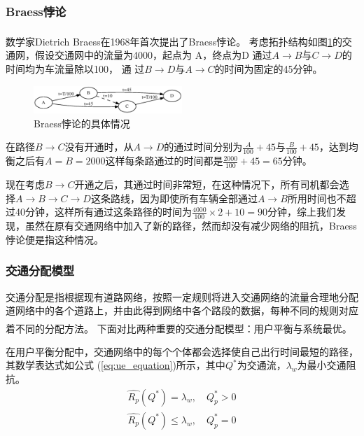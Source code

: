 \documentclass[fontset=fandol,a4paper,12pt]{ctexart}
\newcommand{\upcite}[1]{\textsuperscript{\textsuperscript{\cite{#1}}}}
\renewcommand{\eqref}[1]{公式 (\ref{#1})}
\begin{document}
		\subsubsection{Braess悖论}
			数学家Dietrich Braess在1968年首次提出了Braess悖论\upcite{Braess1968Ü}。
			考虑拓扑结构如图\ref{fig:braess}的交通网，假设交通网中的流量为4000，起点为	A，终点为D
			通过$ A \rightarrow B $与$ C \rightarrow D $的时间均为车流量除以100，	通
			过$ B \rightarrow D $与$ A \rightarrow C $的时间为固定的45分钟。
			\begin{figure}[!htbp]
				\centering
				\includegraphics[width=0.5\textwidth]{pic/braess.eps}
				\caption{Braess悖论的具体情况}
				\label{fig:braess}
			\end{figure}
			在路径$ B \rightarrow C $没有开通时，从$ A \rightarrow D $的通过时间分别为$ \frac{A}{100}+45 $与$ \frac{B}
			{100} + 45 $，达到均衡之后有$ A=B=2000 $这样每条路通过的时间都是$ \frac{2000}{100}
			+45=65 $分钟。
		
			现在考虑$ B \rightarrow C $开通之后，其通过时间非常短，在这种情况下，所有司机都会选择$ A \rightarrow B \rightarrow C \rightarrow D $这条路线，因为即使所有车辆全部通过$ A \rightarrow B $所用时间也不超过40分钟，这样所有通过这条路径的时间为$ \frac{4000}{100}\times 2+10=90$分钟，综上我们发现，虽然在原有交通网络中加入了新的路径，然而却没有减少网络的阻抗，Braess悖论便是指这种情况。		
		\subsubsection{交通分配模型}
			交通分配是指根据现有道路网络，按照一定规则将进入交通网络的流量合理地分配道网络中的各个道路上，并由此得到网络中各个路段的数据，每种不同的规则对应着不同的分配方法\upcite{陆化普1996动态交通分配理论的回顾与展望}。
			下面对比两种重要的交通分配模型：用户平衡与系统最优\upcite{陆化普2006交通规划理论与方法}。
			
			在用户平衡分配中，交通网络中的每个个体都会选择使自己出行时间最短的路径，其数学表达式如\eqref{eq:ue_equation}所示，其中$Q^*$为交通流，$\lambda_w$为最小交通阻抗。
			\begin{equation}
				\begin{array}{c}
					\hat{R_p}(Q^*)=\lambda_w,\quad Q_p^* > 0\\
					\hat{R_p}(Q^*)\leq\lambda_w,\quad Q_p^* = 0
				\end{array}
				\label{eq:ue_equation}
			\end{equation}
			
\end{document}
